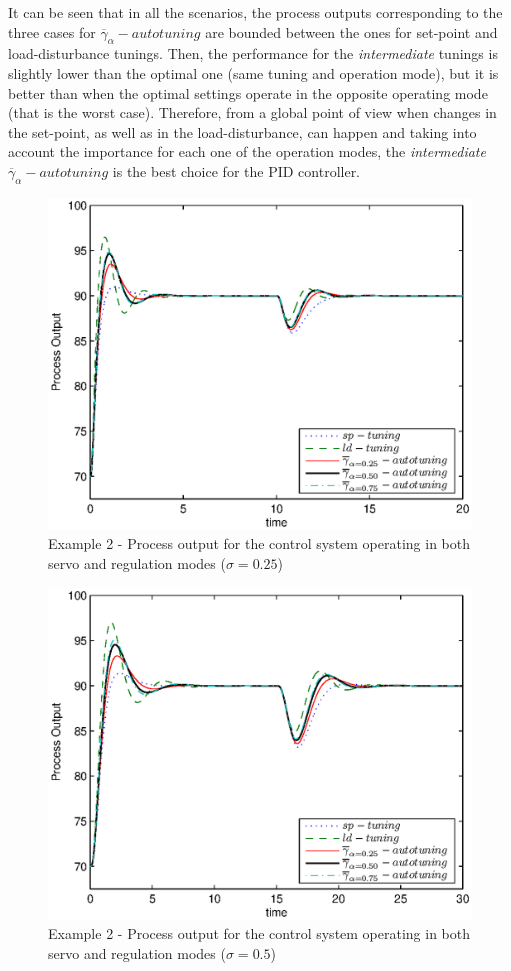 It can be seen that in all the scenarios, the process outputs
corresponding to the three cases for
$\overline{\gamma}_{\alpha}-autotuning$ are bounded between the
ones for set-point and load-disturbance tunings. Then, the
performance for the \emph{intermediate} tunings is slightly lower
than the optimal one (same tuning and operation mode), but it is
better than when the optimal settings operate in the opposite
operating mode (that is the worst case). Therefore, from a global
point of view when changes in the set-point, as well as in the
load-disturbance, can happen and taking into account the
importance for each one of the operation modes, the
\emph{intermediate} $\overline{\gamma}_{\alpha}-autotuning$ is the
best choice for the PID controller.

\begin{figure}[htb!]
    \begin{center}
        \includegraphics[width=0.7\linewidth]{y2outps1_2.eps}
        \caption{Example 2 - Process output for the control system operating in both servo and regulation modes ($\sigma=0.25$)}
        \label{y2_out12}
    \end{center}
\end{figure}

\begin{figure}[htb!]
    \begin{center}
        \includegraphics[width=0.7\linewidth]{y2outps3.eps}
        \caption{Example 2 - Process output for the control system operating in both servo and regulation modes ($\sigma=0.5$)}
        \label{y2_out3}
    \end{center}
\end{figure}

